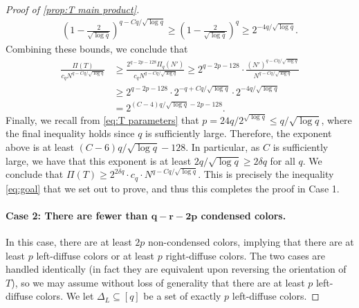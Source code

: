 \documentclass[10pt,a4paper]{amsart}
\begin{document}
\begin{proof}[Proof of \cref{prop:T main product}]
    \begin{align*}
        \left( 1-\frac{2}{{\sqrt{\log q}}} \right)^{q-Cq/\sqrt{\log q}} \geq\left( 1-\frac{2}{{\sqrt{\log q}}} \right)^q \geq 2^{-4q/\sqrt{\log q}}.
    \end{align*}
    Combining these bounds, we conclude that
    \begin{align*}
        \frac{\Pi(T)}{c_q N^{q-Cq/\sqrt{\log q}}} &\geq \frac{2^{q-2p-128} \Pi_q(N')}{c_q N^{q-Cq/\sqrt{\log q}}}\geq 2^{q-2p-128} \cdot \frac{(N')^{q-Cq/\sqrt{\log q}}}{N^{q-Cq/\sqrt{\log q}}}\\
        &\geq 2^{q-2p-128} \cdot 2^{-q+Cq/\sqrt{\log q}} \cdot 2^{-4q/\sqrt{\log q}}\\
        &= 2^{(C-4)q/\sqrt{\log q} -2p -128}.
    \end{align*}
    Finally, we recall from \eqref{eq:T parameters} that $p = 24q/2^{\sqrt{\log q}} \leq q/\sqrt{\log q}$, where the final inequality holds since $q$ is sufficiently large. Therefore, the exponent above is at least $(C-6)q/\sqrt{\log q}-128$. In particular, as $C$ is sufficiently large, we have that this exponent is at least $2q/{\sqrt{\log q}}\geq 2\delta q$ for all $q$. We conclude that $\Pi(T) \geq 2^{2\delta q}\cdot c_q\cdot N^{q-Cq/\sqrt{\log q}}$. 
    This is precisely the inequality \eqref{eq:goal} that we set out to prove, and thus this completes the proof in Case 1.

    \paragraph{\bf Case 2: There are fewer than $\bm{q-r-2p}$ condensed colors.} In this case, there are at least $2p$ non-condensed colors, implying that there are at least $p$ left-diffuse colors or at least $p$ right-diffuse colors. The two cases are handled identically (in fact they are equivalent upon reversing the orientation of $T$), so we may assume without loss of generality that there are at least $p$ left-diffuse colors. We let $\Delta_L\subseteq [q]$ be a set of exactly $p$ left-diffuse colors.


\end{proof}
\end{document}
